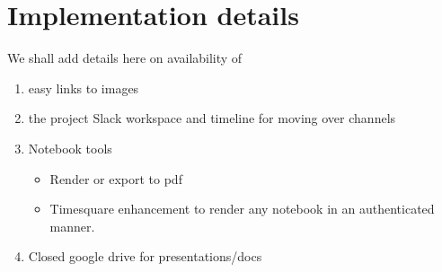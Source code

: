 \section{Implementation details} \label{sec:implementation}

We shall add details here on availability of

\begin{enumerate}
\item easy links to images
\item the project Slack workspace and timeline for moving over channels
\item Notebook tools

\begin{itemize}
\item Render or export to pdf
\item Timesquare enhancement to render any notebook in an authenticated manner.

\end{itemize}
\item Closed google drive for presentations/docs
\end{enumerate}
